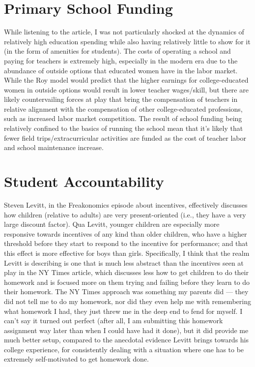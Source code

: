 \documentclass[12pt]{extarticle}
\title{}
\author{}
\date{}
\begin{document}
  \section{Primary School Funding}%
  While listening to the article, I was not particularly shocked at the dynamics of relatively high education spending while also having relatively little to show for it (in the form of amenities for students). The costs of operating a school and paying for teachers is extremely high, especially in the modern era due to the abundance of outside options that educated women have in the labor market. While the Roy model would predict that the higher earnings for college-educated women in outside options would result in lower teacher wages/skill, but there are likely countervailing forces at play that bring the compensation of teachers in relative alignment with the compensation of other college-educated professions, such as increased labor market competition. The result of school funding being relatively confined to the basics of running the school mean that it's likely that fewer field trips/extracurricular activities are funded as the cost of teacher labor and school maintenance increase.
  \section{Student Accountability}%
  Steven Levitt, in the Freakonomics episode about incentives, effectively discusses how children (relative to adults) are very present-oriented (i.e., they have a very large discount factor). Qua Levitt, younger children are especially more responsive towards incentives of any kind than older children, who have a higher threshold before they start to respond to the incentive for performance; and that this effect is more effective for boys than girls. Specifically, I think that the realm Levitt is describing is one that is much less abstract than the incentives seen at play in the NY Times article, which discusses less how to get children to do their homework and is focused more on them trying and failing before they learn to do their homework. The NY Times approach was something my parents did --- they did not tell me to do my homework, nor did they even help me with remembering what homework I had, they just threw me in the deep end to fend for myself. I can't say it turned out perfect (after all, I am submitting this homework assignment way later than when I could have had it done), but it did provide me much better setup, compared to the anecdotal evidence Levitt brings towards his college experience, for consistently dealing with a situation where one has to be extremely self-motivated to get homework done.
\end{document}
